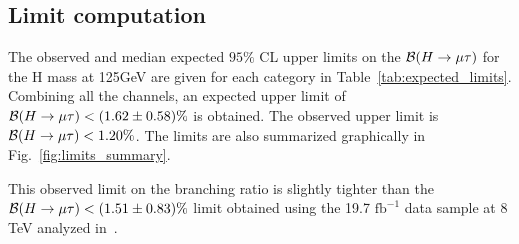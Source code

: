 \documentclass[oneside, letterpaper, oldfontcommands]{memoir}
\begin{document}
{{{\subsection{Limit computation}

The observed and median expected $95\%$ CL upper limits on the $\mathcal{B}(H \rightarrow \mu \mathrm{\tau} )$ for the H mass at 125GeV are given for each category
in Table~\ref{tab:expected_limits}.  Combining all
the channels, an expected upper limit of $\mathcal{B}(H \rightarrow \mu \mathrm{\tau} )<(1.62 \pm 0.58)\%$ is obtained.
The observed upper limit is $\mathcal{B}(H \rightarrow \mu \mathrm{\tau} ) < 1.20\%$.
The limits are also  summarized graphically  in
Fig.~\ref{fig:limits_summary}.

This observed limit on the branching ratio is slightly tighter than the $\mathcal{B}(H \rightarrow \mu \mathrm{\tau} )<(1.51 \pm 0.83)\%$ limit obtained using the 19.7 $\textrm{fb}^{-1}$ data sample at 8 TeV analyzed in~\cite{Khachatryan:2015kon}.

}}}
\end{document}
